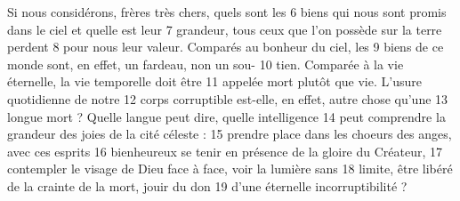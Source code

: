 Si nous considérons, frères très chers, quels sont les	 
6	 	biens qui nous sont promis dans le ciel et quelle est leur	 
7	 	grandeur, tous ceux que l'on possède sur la terre perdent	 
8	 	pour nous leur valeur. Comparés au bonheur du ciel, les	 
9	 	biens de ce monde sont, en effet, un fardeau, non un sou-	 
10	 	tien. Comparée à la vie éternelle, la vie temporelle doit être	 
11	 	appelée mort plutôt que vie. L'usure quotidienne de notre	 
12	 	corps corruptible est-elle, en effet, autre chose qu'une	 
13	 	longue mort ? Quelle langue peut dire, quelle intelligence	 
14	 	peut comprendre la grandeur des joies de la cité céleste :	 
15	 	prendre place dans les choeurs des anges, avec ces esprits	 
16	 	bienheureux se tenir en présence de la gloire du Créateur,	 
17	 	contempler le visage de Dieu face à face, voir la lumière sans	 
18	 	limite, être libéré de la crainte de la mort, jouir du don	 
19	 	d'une éternelle incorruptibilité ?